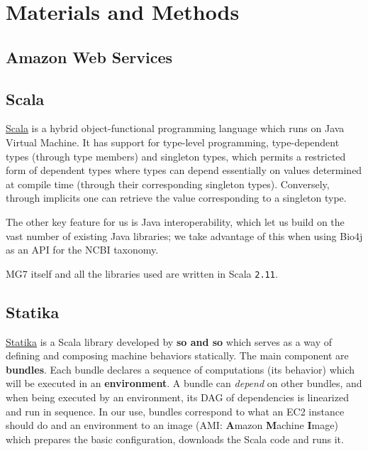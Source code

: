 \documentclass{frontiersSCNS} %
\begin{document}
\section{Materials and Methods}\label{materials-and-methods}

\subsection{Amazon Web Services}\label{amazon-web-services}

\subsection{Scala}\label{scala}

\href{http://www.scala-lang.org/}{Scala} is a hybrid object-functional
programming language which runs on Java Virtual Machine. It has support
for type-level programming, type-dependent types (through type members)
and singleton types, which permits a restricted form of dependent types
where types can depend essentially on values determined at compile time
(through their corresponding singleton types). Conversely, through
implicits one can retrieve the value corresponding to a singleton type.

The other key feature for us is Java interoperability, which let us
build on the vast number of existing Java libraries; we take advantage
of this when using Bio4j as an API for the NCBI taxonomy.

MG7 itself and all the libraries used are written in Scala
\texttt{2.11}.

\subsection{Statika}\label{statika}

\href{https://github.com/ohnosequences/statika}{Statika} is a Scala
library developed by \textbf{so and so} which serves as a way of
defining and composing machine behaviors statically. The main component
are \textbf{bundles}. Each bundle declares a sequence of computations
(its behavior) which will be executed in an \textbf{environment}. A
bundle can \emph{depend} on other bundles, and when being executed by an
environment, its DAG of dependencies is linearized and run in sequence.
In our use, bundles correspond to what an EC2 instance should do and an
environment to an image (AMI: \textbf{A}mazon \textbf{M}achine
\textbf{I}mage) which prepares the basic configuration, downloads the
Scala code and runs it.
\end{document}
